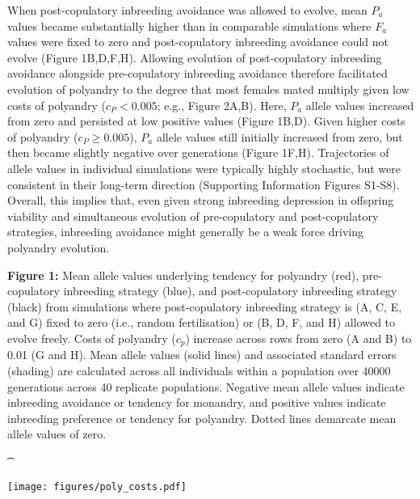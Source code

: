 \documentclass[10pt,letterpaper]{article}
\begin{document}
When post-copulatory inbreeding avoidance was allowed to evolve, mean $P_{a}$ values became substantially higher than in comparable simulations where $F_{a}$ values were fixed to zero and post-copulatory inbreeding avoidance could not evolve (Figure 1B,D,F,H). Allowing evolution of post-copulatory inbreeding avoidance alongside pre-copulatory inbreeding avoidance therefore facilitated evolution of polyandry to the degree that most females mated multiply given low costs of polyandry ($c_{P} < 0.005$; e.g., Figure 2A,B). Here, $P_{a}$ allele values increased from zero and persisted at low positive values (Figure 1B,D). Given higher costs of polyandry ($c_{P} \geq 0.005$), $P_{a}$ allele values still initially increased from zero, but then became slightly negative over generations (Figure 1F,H). Trajectories of allele values in individual simulations were typically highly stochastic, but were consistent in their long-term direction (Supporting Information Figures S1-S8). Overall, this implies that, even given strong inbreeding depression in offspring viability and simultaneous evolution of pre-copulatory and post-copulatory strategies, inbreeding avoidance might generally be a weak force driving polyandry evolution.

{\color{Gray}
    \begin{adjustwidth}{-2.2in}{0in}
{ 
        \begin{justify}
        \vspace{-14.25 mm}
        {\bf Figure 1:} Mean allele values underlying tendency for polyandry (red), pre-copulatory inbreeding strategy (blue), and post-copulatory inbreeding strategy (black) from simulations where post-copulatory inbreeding strategy is (A, C, E, and G) fixed to zero (i.e., random fertilisation) or (B, D, F, and H) allowed to evolve freely. Costs of polyandry ($c_p$) increase across rows from zero (A and B) to 0.01 (G and H). Mean allele values (solid lines) and associated standard errors (shading) are calculated across all individuals within a population over 40000 generations across 40 replicate populations. Negative mean allele values indicate inbreeding avoidance or tendency for monandry, and positive values indicate inbreeding preference or tendency for polyandry. Dotted lines demarcate mean allele values of zero.
    \end{justify}{\t}
}
{
   \texttt{[image: figures/poly\_costs.pdf]}%
}
    \end{adjustwidth}
}
\end{document}
